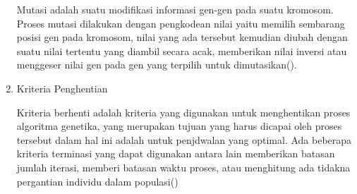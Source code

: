 \begin{enumerate}
  Mutasi adalah suatu modifikasi informasi gen-gen pada suatu kromosom. Proses mutasi dilakukan dengan pengkodean nilai yaitu memilih sembarang posisi gen pada kromosom, nilai yang ada tersebut kemudian diubah dengan suatu nilai tertentu yang diambil secara acak, memberikan nilai inversi atau menggeser nilai gen pada gen yang terpilih untuk dimutasikan(\cite{JMASIF2649}).
  \item Kriteria Penghentian
  
  Kriteria berhenti adalah kriteria yang digunakan untuk menghentikan proses algoritma genetika, yang merupakan tujuan yang harus dicapai oleh proses tersebut dalam hal ini adalah untuk penjdwalan yang optimal. Ada beberapa kriteria terminasi yang dapat digunakan antara lain memberikan batasan jumlah iterasi, memberi batasan waktu proses, atau menghitung ada tidakna pergantian individu dalam populasi(\cite{Ardiansyah2022})
\end{enumerate}






